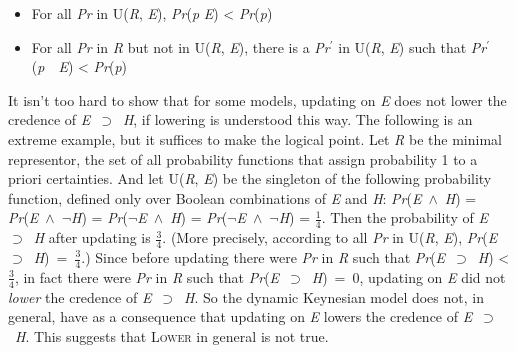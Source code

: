\documentclass[
  11pt,
  letterpaper,
  DIV=11,
  numbers=noendperiod,
  oneside]{scrartcl}
\begin{document}
\begin{itemize}
\item
  For all \emph{Pr} in U(\emph{R}, \emph{E}), \emph{Pr}(\emph{p}
  \emph{E}) \textless{} \emph{Pr}(\emph{p})
\item
  For all \emph{Pr} in \emph{R} but not in U(\emph{R}, \emph{E}), there
  is a \emph{Pr}\(^\prime\) in U(\emph{R}, \emph{E}) such that
  \emph{Pr}\(^\prime\)(\emph{p}~~\emph{E}) \textless{}
  \emph{Pr}(\emph{p})
\end{itemize}

It isn't too hard to show that for some models, updating on \emph{E}
does not lower the credence of \emph{E}~\({\supset}\)~\emph{H}, if
lowering is understood this way. The following is an extreme example,
but it suffices to make the logical point. Let \emph{R} be the minimal
representor, the set of all probability functions that assign
probability 1 to a priori certainties. And let U(\emph{R}, \emph{E}) be
the singleton of the following probability function, defined only over
Boolean combinations of \emph{E} and \emph{H}:
\emph{Pr}(\emph{E}~\({\wedge}\)~\emph{H}) =
\emph{Pr}(\emph{E}~\({\wedge}\)~\({\lnot}\)\emph{H}) =
\emph{Pr}(\({\lnot}\)\emph{E}~\({\wedge}\)~\emph{H}) =
\emph{Pr}(\({\lnot}\)\emph{E}~\({\wedge}\)~\({\lnot}\)\emph{H}) =
\(\frac{1}{4}\). Then the probability of \emph{E}~\({\supset}\)~\emph{H}
after updating is \(\frac{3}{4}\). (More precisely, according to all
\emph{Pr} in U(\emph{R}, \emph{E}),
\emph{Pr}(\emph{E}~\({\supset}\)~\emph{H})~=~\(\frac{3}{4}\).) Since
before updating there were \emph{Pr} in \emph{R} such that
\emph{Pr}(\emph{E}~\({\supset}\)~\emph{H}) \textless{} \(\frac{3}{4}\),
in fact there were \emph{Pr} in \emph{R} such that
\emph{Pr}(\emph{E}~\({\supset}\)~\emph{H})~=~0, updating on \emph{E} did
not \emph{lower} the credence of \emph{E}~\({\supset}\)~\emph{H}. So the
dynamic Keynesian model does not, in general, have as a consequence that
updating on \emph{E} lowers the credence of
\emph{E}~\({\supset}\)~\emph{H}. This suggests that \textsc{Lower} in
general is not true.
\end{document}
